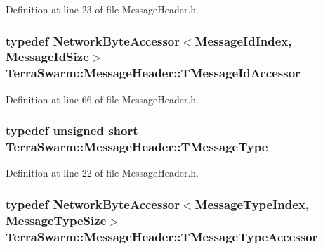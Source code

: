Definition at line 23 of file Message\-Header.\-h.

\hypertarget{class_terra_swarm_1_1_message_header_a269de9ac839cc588d65fad2e27f6dcbb}{
\subsubsection[{T\-Message\-Id\-Accessor}]{\setlength{\rightskip}{0pt plus 5cm}typedef {\bf Network\-Byte\-Accessor}$<${\bf Message\-Id\-Index}, {\bf Message\-Id\-Size}$>$ {\bf Terra\-Swarm\-::\-Message\-Header\-::\-T\-Message\-Id\-Accessor}\hspace{0.3cm}{\ttfamily [private]}}}\label{class_terra_swarm_1_1_message_header_a269de9ac839cc588d65fad2e27f6dcbb}


Definition at line 66 of file Message\-Header.\-h.

\hypertarget{class_terra_swarm_1_1_message_header_a6eaf3733d65fa5eaac0c223da4f5670c}{
\subsubsection[{T\-Message\-Type}]{\setlength{\rightskip}{0pt plus 5cm}typedef unsigned short {\bf Terra\-Swarm\-::\-Message\-Header\-::\-T\-Message\-Type}}}\label{class_terra_swarm_1_1_message_header_a6eaf3733d65fa5eaac0c223da4f5670c}


Definition at line 22 of file Message\-Header.\-h.

\hypertarget{class_terra_swarm_1_1_message_header_ae21a1eeb66f61c557c12f05440aa6f5b}{
\subsubsection[{T\-Message\-Type\-Accessor}]{\setlength{\rightskip}{0pt plus 5cm}typedef {\bf Network\-Byte\-Accessor}$<${\bf Message\-Type\-Index}, {\bf Message\-Type\-Size}$>$ {\bf Terra\-Swarm\-::\-Message\-Header\-::\-T\-Message\-Type\-Accessor}\hspace{0.3cm}{\ttfamily [private]}}}\label{class_terra_swarm_1_1_message_header_ae21a1eeb66f61c557c12f05440aa6f5b}


